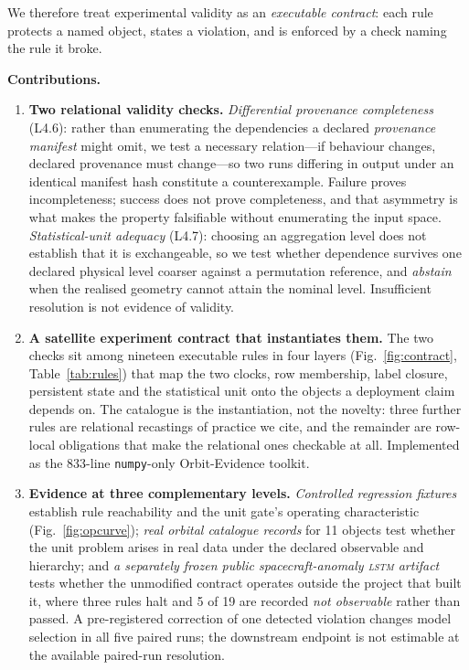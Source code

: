 \documentclass[conference]{IEEEtran}
\newcommand{\rulename}[1]{\textsf{#1}}
\newcommand{\artv}[2]{#2}
\begin{document}
We therefore treat experimental validity as an \emph{executable contract}: each rule protects a
named object, states a violation, and is enforced by a check naming the rule it broke.

\textbf{Contributions.}
\begin{enumerate}
\item \textbf{Two relational validity checks.} \emph{Differential provenance completeness}
(\rulename{L4.6}): rather than enumerating the dependencies a declared \emph{provenance manifest}
might omit, we test a
necessary relation---if behaviour changes, declared provenance must change---so two runs differing
in output under an identical manifest hash constitute a counterexample. Failure proves
incompleteness; success does not prove completeness, and that asymmetry is what makes the property
falsifiable without enumerating the input space. \emph{Statistical-unit adequacy}
(\rulename{L4.7}): choosing an aggregation level does not establish that it is exchangeable, so we
test whether dependence survives one declared physical level coarser against a permutation
reference, and \emph{abstain} when the realised geometry cannot attain the nominal level.
Insufficient resolution is not evidence of validity.
\item \textbf{A satellite experiment contract that instantiates them.} The two checks sit among
nineteen executable rules in four layers (Fig.~\ref{fig:contract},
Table~\ref{tab:rules}) that map the two clocks, row membership, label closure, persistent state and the
statistical unit onto the objects a deployment claim depends on. The catalogue is the
instantiation, not the novelty: three further rules are relational recastings of practice we cite,
and the remainder are row-local obligations that make the relational ones checkable at all.
Implemented as the \artv{source_loc}{\num{833}}-line \texttt{numpy}-only Orbit-Evidence toolkit.
\item \textbf{Evidence at three complementary levels.} \emph{Controlled regression fixtures}
establish rule reachability and the unit gate's operating characteristic
(Fig.~\ref{fig:opcurve}); \emph{real orbital catalogue records} for
\artv{real_objects}{\num{11}} objects test whether the unit problem arises in real data under the
declared observable and hierarchy; and \emph{a separately frozen public spacecraft-anomaly
\textsc{lstm} artifact} tests whether the unmodified contract operates outside the project that
built it, where \artv{ext_halt}{three} rules halt and
\artv{ext_nobs}{\num{5}} of \artv{ext_classified}{\num{19}} are recorded \emph{not observable}
rather than passed. A pre-registered correction of one detected violation changes model selection in
all five paired runs; the downstream endpoint is not estimable at the available paired-run
resolution.
\end{enumerate}
\end{document}
